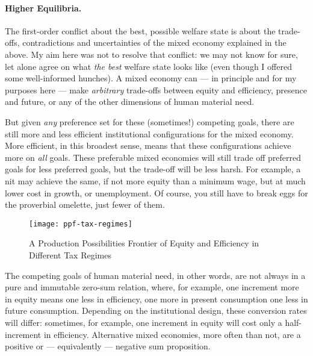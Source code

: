 \paragraph[Higher Equilibria]{Higher Equilibria.}
The first-order conflict about the best, possible welfare state is about the trade-offs, contradictions and uncertainties of the mixed economy explained in the above.
My aim here was not to resolve that conflict:
we may not know for sure, let alone agree on what \emph{the best} welfare state looks like (even though I offered some well-informed hunches).
A mixed economy can --- in principle and for my purposes here --- make \emph{arbitrary} trade-offs between equity and efficiency, presence and future, or any of the other dimensions of human material need.


But given \emph{any} preference set for these (sometimes!) competing goals, there are still more and less efficient institutional configurations for the mixed economy.
More efficient, in this broadest sense, means that these configurations achieve more on \emph{all} goals.
These preferable mixed economies will still trade off preferred goals for less preferred goals, but the trade-off will be less harsh.
For example, a \gls{nit} may achieve the same, if not more equity than a minimum wage, but at much lower cost in growth, or unemployment.
Of course, you still have to break eggs for the proverbial omelette, just fewer of them.


\begin{figure}[htbp]
	\centering
	\texttt{[image: ppf-tax-regimes]}
	\caption[Equity-Efficiency Trade-offs of Different Tax Regimes]{A Production Possibilities Frontier of Equity and Efficiency in Different Tax Regimes}
	\label{fig:ppf-tax-regimes} %
\end{figure}

The competing goals of human material need, in other words, are not always in a pure and immutable zero-sum relation, where, for example, one increment more in equity means one less in efficiency, one more in present consumption one less in future consumption.
Depending on the institutional design, these conversion rates will differ:
sometimes, for example, one increment in equity will cost only a half-increment in efficiency.
Alternative mixed economies, more often than not, are a positive or --- equivalently --- negative sum proposition.

